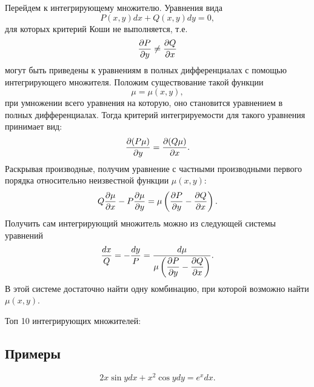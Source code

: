     Перейдем к интегрирующему множителю. Уравнения вида
    \[
        P(x, y)dx + Q(x, y)dy = 0,
    \]
    для которых критерий Коши не выполняется, т.е.
    \[
        \dfrac{\partial P}{\partial y} \neq \dfrac{\partial Q}{\partial x}
    \]
    могут быть приведены к уравнениям в полных дифференциалах с помощью интегрирующего множителя. Положим существование такой функции
    \[
        \mu = \mu(x, y),
    \]
    при умножении всего уравнения на которую, оно становится уравнением в полных дифференциалах. Тогда критерий интегрируемости для такого уравнения принимает вид:
    \[
        \dfrac{\partial (P\mu)}{\partial y} = \dfrac{\partial (Q\mu)}{\partial x}.
    \]
    Раскрывая производные, получим уравнение с частными производными первого порядка относительно неизвестной функции $ \mu(x, y) $:
    \[
        Q\dfrac{\partial \mu}{\partial x} - P\dfrac{\partial \mu}{\partial y} = \mu \left( \dfrac{\partial P}{\partial y} - \dfrac{\partial Q}{\partial x} \right).
    \]
    Получить сам интегрирующий множитель можно из следующей системы уравнений
    \[
        \dfrac{dx}{Q} = -\dfrac{dy}{P} = \dfrac{d\mu}{\mu \left( \dfrac{\partial P}{\partial y} - \dfrac{\partial Q}{\partial x} \right)}.
    \]
    В этой системе достаточно найти одну комбинацию, при которой возможно найти $ \mu(x, y) $.

    Топ 10 интегрирующих множителей:

    \subsection{Примеры}
        \[
            2x \sin{y} dx + x^2 \cos{y} dy = e^x dx.
        \]

